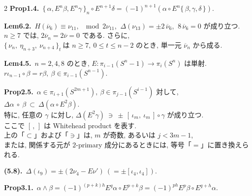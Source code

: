 \documentclass[10pt, leqno]{ltjsarticle}
\newcommand{\toda}[1]{\{\,#1\,\}}              %
\newcommand{\todai}[2][]{\{\,#2\,\}_{#1}}      %
\newcommand{\pis}[2]{\pi_{#1}(#2)}       %
\numberwithin{equation}{section}
\theoremstyle{plain}
\theoremstyle{definition}
\theoremstyle{remark}
\begin{document}
\begin{paracol}{2}
\noindent
\textbf{Prop1.4.}\
\(\todai[n]{\alpha, E^n\beta, E^n\gamma}\circ E^{n+1}\delta
= (-1)^{n+1}(\alpha\circ E^n\toda{\beta, \gamma, \delta})\).

\noindent
\textbf{Lem6.2.}\
\(H(\overline{\nu}_6)\equiv\nu_{11},\ \mod 2\nu_{11}\text{}\), 
\(\ \Delta(\nu_{13})=\pm 2\,\overline{\nu}_6\), 
\(\ 8\,\overline{\nu}_6=0\) が成り立つ. \\
\(n\ge7\) では,
\(2\overline{\nu}_n=2\overline{\nu}=0\) である. さらに,\\
\(
\todai[t]{\nu_n,\ \eta_{n+3},\ \nu_{n+4}}\ \text{は }n\ge7,\ 
0\le t\le n-2\text{ のとき, 単一元 }\overline{\nu}_n\text{ から成る. }
\)

\noindent
\textbf{Lem4.5.}\
\(n=2,4,8\) のとき, 
\(E:\pis{i-1}{S^n-1}\to\pis{i}{S^n}\) は単射.\\ 
\(r\iota_{n-1}\circ\beta = r\beta,\ \beta\in\pis{i-1}{S^{n-1}}\).

\noindent
\textbf{Prop2.5.}\
$\alpha\in\pi_{i+1}(S^{2m+1}), \ \beta\in \pi_{j-1}(S^{i-1})$ 対して, 
\(
\Delta\alpha\ \circ\ \beta\ \subset\ \Delta(\alpha\circ E^2\beta).
\)\\
特に, 任意の $\gamma$ に対し,
\(
\Delta(E^2\gamma)\ \ni\ \pm\,[\,\iota_m,\ \iota_m\,]\circ\gamma
\)
が成り立つ. \\
ここで $[\, ,\,]$ は Whitehead product を表す. \\
上の「$\subset$」および「$\ni$」は, $m$ が奇数, 
あるいは $j<3m-1$, \\
または, 関係する元が \(2\)-primary 成分にあるときには, 
等号「$=$」に置き換えられる. 

\noindent
\textbf{(5.8).}\
\(\Delta(\iota_9)=\pm(2\nu_4-E\nu')  \ (=\pm[\iota_4, \iota_4]) .\)

\noindent
\textbf{Prop3.1.}\
\(
\alpha \wedge \beta
= (-1)^{(p+k)h} E^{q}\alpha \circ E^{p+k}\beta
= (-1)^{ph} E^{p}\beta \circ E^{q+h}\alpha .
\)






\end{paracol}
\end{document}
